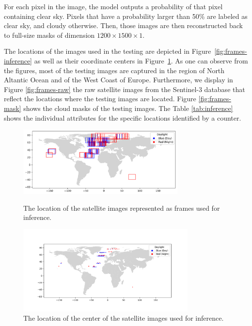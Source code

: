 \documentclass[sigplan,screen]{acmart}
\begin{document}
For each pixel in the image, the model outputs a probability of that pixel containing clear sky. Pixels that have a probability larger than 50\% are labeled as clear sky, and cloudy otherwise. Then, those images are then reconstructed back to full-size masks of dimension $1200 \times 1500 \times 1$. 

The locations of the images used in the testing are depicted in Figure~\ref{fig:frames-inference} as well as their coordinate centers in Figure~\ref{fig:frames-dot}. As one can observe from the figures, most of the testing images are captured in the region of North Altantic Ocean and of the West Coast of Europe.
Furthermore, we display in Figure \ref{fig:frames-raw} the raw satellite images from the Sentinel-3 database that reflect the locations where the testing images are located. Figure \ref{fig:frames-mask} shows the cloud masks of the testing images.
The Table \ref{tab:inference} shows the individual attributes for the specific locations identified by a counter.

\begin{figure}[htb]
\centering\includegraphics[width=0.75\textwidth]{images/inference-frames.pdf}
\caption{The location of the satellite images represented as frames used for inference.}
\label{fig:frames-inference}

\centering\includegraphics[width=0.8\textwidth]{images/inference-dots.png}
\caption{The location of the center of the satellite images used for inference.}
\label{fig:frames-dot}
\end{figure}
\end{document}
